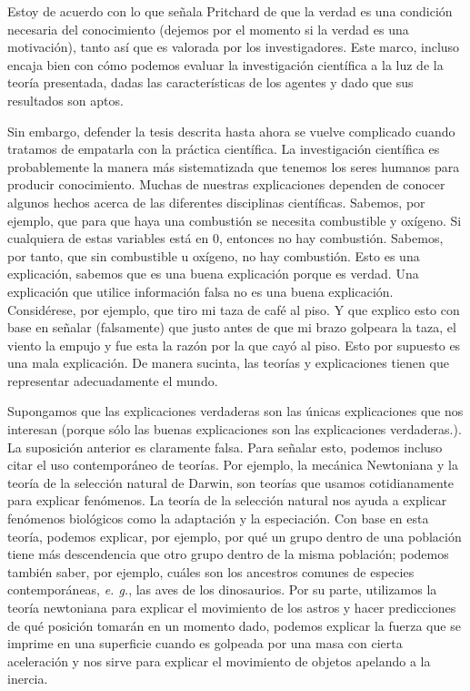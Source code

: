 \documentclass{article}
\begin{document}
Estoy de acuerdo con lo que señala Pritchard de que la verdad es una condición necesaria del conocimiento (dejemos por el momento si la verdad es una motivación), tanto así que es valorada por los investigadores. Este marco, incluso encaja bien con cómo podemos evaluar la investigación científica a la luz de la teoría presentada, dadas las características de los agentes y dado que sus resultados son aptos. 

Sin embargo, defender la tesis descrita hasta ahora se vuelve complicado cuando tratamos de empatarla con la práctica científica. La investigación científica es probablemente la manera más sistematizada que tenemos los seres humanos para producir conocimiento. Muchas de nuestras explicaciones dependen de conocer algunos hechos acerca de las diferentes disciplinas científicas. Sabemos, por ejemplo, que para que haya una combustión se necesita combustible y oxígeno. Si cualquiera de estas variables está en 0, entonces no hay combustión. Sabemos, por tanto, que sin combustible u oxígeno, no hay combustión. Esto es una explicación, sabemos que es una buena explicación porque es verdad. Una explicación que utilice información falsa no es una buena explicación. Considérese, por ejemplo, que tiro mi taza de café al piso. Y que explico esto con base en señalar (falsamente) que justo antes de que mi brazo golpeara la taza, el viento la empujo y fue esta la razón por la que cayó al piso. Esto por supuesto es una mala explicación. De manera sucinta, las teorías y explicaciones tienen que representar adecuadamente el mundo.

Supongamos que las explicaciones verdaderas son las únicas explicaciones que nos interesan (porque sólo las buenas explicaciones son las explicaciones verdaderas.). La suposición anterior es claramente falsa. Para señalar esto, podemos incluso citar el uso contemporáneo de teorías. Por ejemplo, la mecánica Newtoniana y la teoría de la selección natural de Darwin, son teorías que usamos cotidianamente para explicar fenómenos. La teoría de la selección natural nos ayuda a explicar fenómenos biológicos como la adaptación y la especiación. Con base en esta teoría, podemos explicar, por ejemplo, por qué un grupo dentro de una población tiene más descendencia que otro grupo dentro de la misma población; podemos también saber, por ejemplo, cuáles son los ancestros comunes de especies contemporáneas, \textit{e. g.}, las aves de los dinosaurios. Por su parte, utilizamos la teoría newtoniana para explicar el movimiento de los astros y hacer predicciones de qué posición tomarán en un momento dado, podemos explicar la fuerza que se imprime en una superficie cuando es golpeada por una masa con cierta aceleración y nos sirve para explicar el movimiento de objetos apelando a la inercia.
\end{document}
